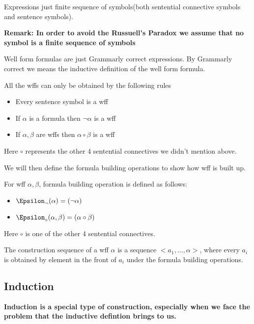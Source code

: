 \documentclass[11pt]{article}
\begin{document}
\begin{definition}[Expressions]
Expressions just finite sequence of symbols(both sentential connective symbols and sentence symbols).
\end{definition}

\textbf{Remark: In order to avoid the Russuell's Paradox we assume that no symbol is a finite sequence of symbols}

\begin{definition}
Well form formulas are just Grammarly correct expressions. By Grammarly correct we means the inductive definition of the well form formula.
\end{definition}

\begin{proposition}
All the wffs can only be obtained by the following rules
\begin{itemize}
\item Every sentence symbol is a wff
\item If \(\alpha\) is a formula then \(\neg\alpha\) is a wff
\item If \(\alpha, \beta\) are wffs then \(\alpha \circ \beta\) is a wff
\end{itemize}
Here \(\circ\) represents the other 4 sentential connectives we didn't mention above.
\end{proposition}

We will then define the formula building operations to show how wff is built up.

\begin{definition}
For wff \(\alpha,\beta\), formula building operation is defined as follows:
\begin{itemize}
\item \(\Epsilon_{\neg} (\alpha) = (\neg\alpha)\)
\item \(\Epsilon_{\circ} (\alpha,\beta) = (\alpha \circ \beta)\)
\end{itemize}
Here \(\circ\) is one of the other 4 sentential connectives.
\end{definition}

\begin{definition}
The construction sequence of a wff \(\alpha\) is a sequence \(<a_1,\dots,\alpha>\), where every \(a_i\) is obtained by element in the front of \(a_i\) under the formula building operations.
\end{definition}
\subsection{Induction}
\label{sec:orgc7e16e6}
\textbf{Induction is a special type of construction, especially when we face the problem that the inductive defintion brings to us.}
\end{document}
